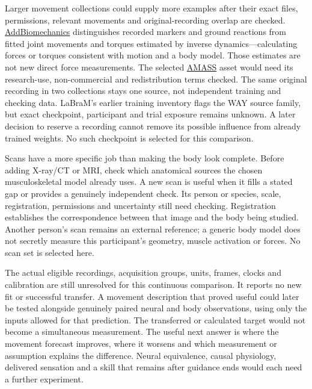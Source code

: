 Larger movement collections could supply more examples after their exact files, permissions, relevant movements and original-recording overlap are checked. \href{https://www.addbiomechanics.org/download_data.html}{AddBiomechanics} distinguishes recorded markers and ground reactions from fitted joint movements and torques estimated by inverse dynamics---calculating forces or torques consistent with motion and a body model. Those estimates are not new direct force measurements. The selected \href{https://amass.is.tue.mpg.de/license.html}{AMASS} asset would need its research-use, non-commercial and redistribution terms checked. The same original recording in two collections stays one source, not independent training and checking data. LaBraM's earlier training inventory flags the WAY source family, but exact checkpoint, participant and trial exposure remains unknown. A later decision to reserve a recording cannot remove its possible influence from already trained weights. No such checkpoint is selected for this comparison.

Scans have a more specific job than making the body look complete. Before adding X-ray/CT or MRI, check which anatomical sources the chosen musculoskeletal model already uses. A new scan is useful when it fills a stated gap or provides a genuinely independent check. Its person or species, scale, registration, permissions and uncertainty still need checking. Registration establishes the correspondence between that image and the body being studied. Another person's scan remains an external reference; a generic body model does not secretly measure this participant's geometry, muscle activation or forces. No scan set is selected here.

The actual eligible recordings, acquisition groups, units, frames, clocks and calibration are still unresolved for this continuous comparison. It reports no new fit or successful transfer. A movement description that proved useful could later be tested alongside genuinely paired neural and body observations, using only the inputs allowed for that prediction. The transferred or calculated target would not become a simultaneous measurement. The useful next answer is where the movement forecast improves, where it worsens and which measurement or assumption explains the difference. Neural equivalence, causal physiology, delivered sensation and a skill that remains after guidance ends would each need a further experiment.

